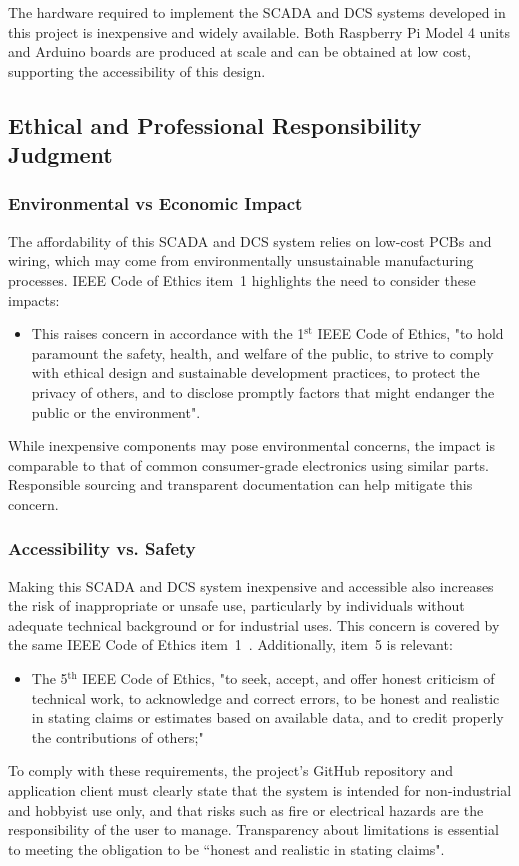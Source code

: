 \documentclass[../main.tex]{subfiles}
\begin{document}
\par The hardware required to implement the SCADA and DCS systems developed in this project is inexpensive and widely available. Both Raspberry Pi Model 4 units and Arduino boards are produced at scale and can be obtained at low cost, supporting the accessibility of this design.

\subsection{Ethical and Professional Responsibility Judgment}

\subsubsection{Environmental vs Economic Impact}
\par The affordability of this SCADA and DCS system relies on low-cost PCBs and wiring, which may come from environmentally unsustainable manufacturing processes. IEEE Code of Ethics item~1 highlights the need to consider these impacts:
\begin{itemize}
    \item This raises concern in accordance with the 1$^\text{st}$ IEEE Code of Ethics, "to hold paramount the safety, health, and welfare of the public, to strive to comply with ethical design and sustainable development practices, to protect the privacy of others, and to disclose promptly factors that might endanger the public or the environment"\cite{b4}.
\end{itemize}
\noindent While inexpensive components may pose environmental concerns, the impact is comparable to that of common consumer-grade electronics using similar parts. Responsible sourcing and transparent documentation can help mitigate this concern.

\subsubsection{Accessibility vs. Safety}
\par Making this SCADA and DCS system inexpensive and accessible also increases the risk of inappropriate or unsafe use, particularly by individuals without adequate technical background or for industrial uses. This concern is covered by the same IEEE Code of Ethics item~1~\cite{b4}. Additionally, item~5 is relevant:
\begin{itemize}
    \item The 5$^\text{th}$ IEEE Code of Ethics, "to seek, accept, and offer honest criticism of technical work, to acknowledge and correct errors, to be honest and realistic in stating claims or estimates based on available data, and to credit properly the contributions of others;"\cite{b4}
\end{itemize}
\noindent To comply with these requirements, the project's GitHub repository and application client must clearly state that the system is intended for non-industrial and hobbyist use only, and that risks such as fire or electrical hazards are the responsibility of the user to manage. Transparency about limitations is essential to meeting the obligation to be ``honest and realistic in stating claims".
\end{document}

